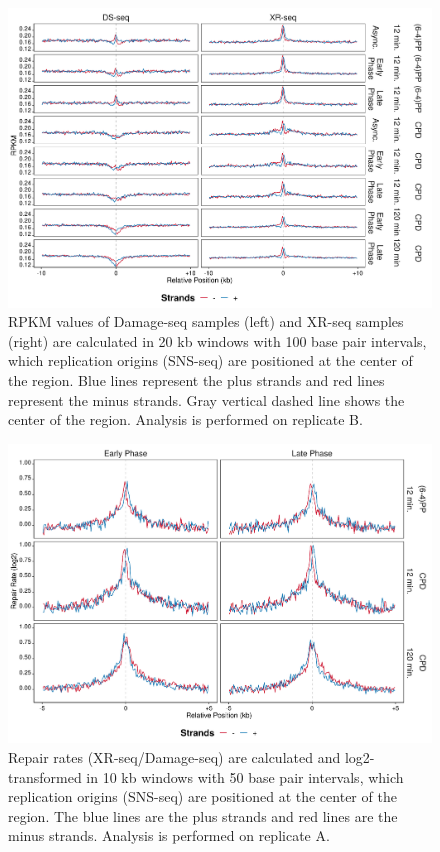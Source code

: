 \begin{figure}[H]
\begin{center}
\includegraphics[width=\textwidth]{Chapters/7_appendix/figures/supfig49}
\caption[Damage and repair events of replication origins in 20 kb (replicate B).]{RPKM values of Damage-seq samples (left) and XR-seq samples (right) are calculated in 20 kb windows with 100 base pair intervals, which replication origins (SNS-seq) are positioned at the center of the region. Blue lines represent the plus strands and red lines represent the minus strands. Gray vertical dashed line shows the center of the region. Analysis is performed on replicate B.}
\label{supfig:rpkm20snsB}
\end{center}
\end{figure}

\begin{figure}[H]
\begin{center}
\includegraphics[width=\textwidth]{Chapters/7_appendix/figures/supfig50}
\caption[Repair rate of replication origins in 10 kb (replicate A).]{Repair rates (XR-seq/Damage-seq) are calculated and log2-transformed in 10 kb windows with 50 base pair intervals, which replication origins (SNS-seq) are positioned at the center of the region. The blue lines are the plus strands and red lines are the minus strands. Analysis is performed on replicate A.}
\label{supfig:rr10snsA}
\end{center}
\end{figure}

